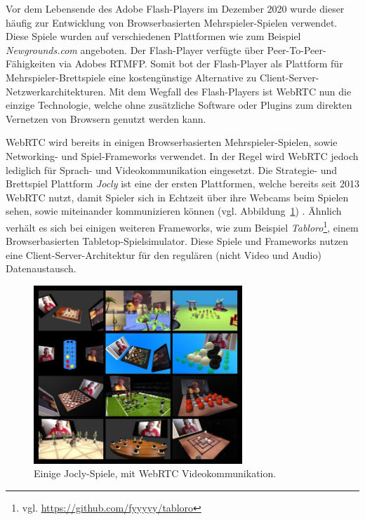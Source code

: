 Vor dem Lebensende des Adobe Flash-Players im Dezember 2020 wurde dieser häufig zur Entwicklung von Browserbasierten Mehrspieler-Spielen verwendet. Diese Spiele wurden auf verschiedenen Plattformen wie zum Beispiel \textit{Newgrounds.com} angeboten. Der Flash-Player verfügte über Peer-To-Peer-Fähigkeiten via Adobes \acf{RTMFP}. Somit bot der Flash-Player als Plattform für Mehrspieler-Brettspiele eine kostengünstige Alternative zu Client-Server-Netzwerkarchitekturen. Mit dem Wegfall des Flash-Players ist WebRTC nun die einzige Technologie, welche ohne zusätzliche Software oder Plugins zum direkten Vernetzen von Browsern genutzt werden kann.\par

\acs{WebRTC} wird bereits in einigen Browserbasierten Mehrspieler-Spielen, sowie Networking- und Spiel-Frameworks verwendet. In der Regel wird WebRTC jedoch lediglich für Sprach- und Videokommunikation eingesetzt. Die Strategie- und Brettspiel Plattform \textit{Jocly} ist eine der ersten Plattformen, welche bereits seit 2013 \acs{WebRTC} nutzt, damit Spieler sich in Echtzeit über ihre Webcams beim Spielen sehen, sowie miteinander kommunizieren können (vgl. Abbildung~\ref{fig:jocly}) \cite{jocly2013}. Ähnlich verhält es sich bei einigen weiteren Frameworks, wie zum Beispiel \textit{Tabloro}\footnote{vgl. \url{https://github.com/fyyyyy/tabloro}}, einem Browserbasierten \glqq{}Tabletop\grqq{}-Spielsimulator. Diese Spiele und Frameworks nutzen eine Client-Server-Architektur für den regulären (nicht Video und Audio) Datenaustausch.

\begin{figure}[h]
\centering
\includegraphics[width=0.70\textwidth]{bilder/jocly-games.jpg}
\caption{Einige Jocly-Spiele, mit WebRTC Videokommunikation.}
\label{fig:jocly}
\end{figure}

